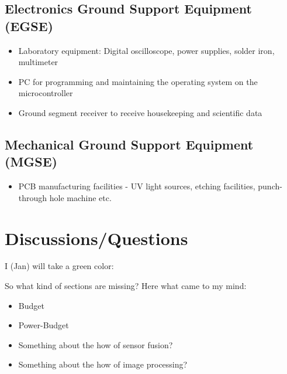 \documentclass[fontsize=11pt,paper=a4,]{scrartcl}
\begin{document}
\subsection{Electronics Ground Support Equipment (EGSE)}
\begin{itemize}
\item Laboratory equipment: Digital oscilloscope, power supplies, solder iron, multimeter
\item PC for programming and maintaining the operating system on the microcontroller
\item Ground segment receiver to receive housekeeping and scientific data
\end{itemize}

\subsection{Mechanical Ground Support Equipment (MGSE)}
\begin{itemize}
\item PCB manufacturing facilities - UV light sources, etching facilities, punch-through hole machine etc.
\end{itemize}


\section{Discussions/Questions}

I (Jan) will take {\color{green} a green color}:

{\color{green} So what kind of sections are missing? Here what came to my mind:
\begin{itemize}
 \item Budget
 \item Power-Budget
 \item Something about the how of sensor fusion?
 \item Something about the how of image processing?
\end{itemize}
}


\newpage
\printbibliography
{}
\pagestyle{plain}
\end{document}
